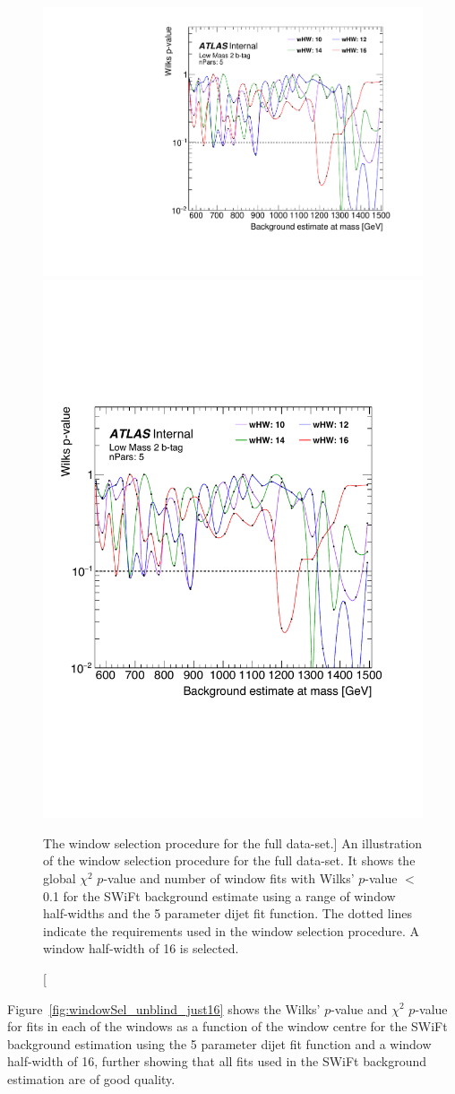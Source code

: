 \begin{figure}[!htb]
\captionsetup[subfigure]{aboveskip=0pt,justification=centering}
\centering
{} {
  \includegraphics[width=0.45\linewidth, angle=0,page=6]{figs/Dibjet/LowMass/FitStudy_min566/windowSel_unblind.pdf}
}\hspace{-5mm}
 {
  \includegraphics[width=0.4\linewidth, angle=0,page=8]{figs/Dibjet/LowMass/FitStudy_min566/windowSel_unblind_edited.pdf}
}
\vspace{2pt}
\caption
    [The window selection procedure for the full \lm{} data-set.]
    {\label{fig:windowSel_unblind}
      An illustration of the window selection procedure for the full \lm{} data-set.
      It shows the global $\chi^{2}$ \mbox{$p$-value} and number of window fits with Wilks' \mbox{$p$-value} $<$ 0.1
      for the SWiFt background estimate using a range of window half-widths and the 5 parameter dijet fit function.
      The dotted lines indicate the requirements used in the window selection procedure. A window half-width of 16 is selected.
    }
\end{figure}

\newpage
Figure~\ref{fig:windowSel_unblind_just16} shows the Wilks' $p$-value and $\chi^2$ $p$-value for fits in each of the windows
as a function of the window centre for the SWiFt background estimation using the 5 parameter dijet fit function and a window half-width of 16,
further showing that all fits used in the SWiFt background estimation are of good quality.


